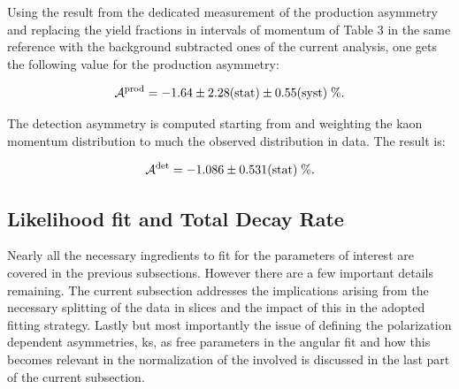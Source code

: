
Using the result from the dedicated \lhcb measurement of the production asymmetry \cite{LHCb-PAPER-2014-042}
and replacing the yield fractions in intervals of \Bs momentum of Table 3 in the same reference with the background
subtracted \BsJpsiKst ones of the current analysis, one gets the following value for the production asymmetry:

\begin{equation}
    \centering
    \Aprod = -1.64 \pm 2.28 \stat \pm 0.55 \syst \;\%.
  \label{prod_assym}
\end{equation}

\noindent The detection asymmetry is computed starting from \cite{LHCb-PAPER-2014-013}
and weighting the kaon momentum distribution to much the observed
distribution in \BsJpsiKst data. The result is:

\begin{equation}
    \centering
    \Adet  = -1.086 \pm 0.531 \stat \; \%.
  \label{det_assym}
\end{equation}

\subsection{Likelihood fit and Total Decay Rate}
\label{Total_Decay_Rate}

Nearly all the necessary ingredients to fit for the parameters of interest are covered in the previous subsections.
However there are a few important details remaining. The current subsection addresses the
implications arising from the necessary splitting of the data in slices and the impact of this in the adopted
fitting strategy. Lastly but most importantly the issue of defining
the polarization dependent \CP asymmetries, \Acp{k}, as free parameters in the angular fit and how this becomes
relevant in the normalization of the \pdfs involved is discussed in the last part of the current subsection.

